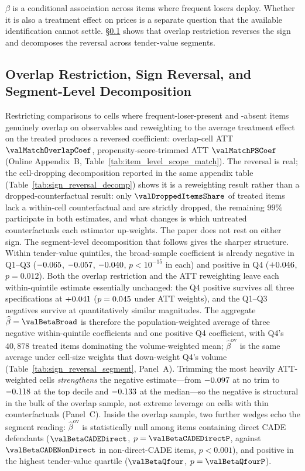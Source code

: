 $\beta$ is a conditional association across items where
frequent losers deploy. Whether it is also a treatment effect
on prices is a separate question that the available
identification cannot settle. \S\ref{sec:results_overlap}
shows that overlap restriction reverses the sign and
decomposes the reversal across tender-value segments.

\subsection{Overlap Restriction, Sign Reversal, and Segment-Level Decomposition}
\label{sec:results_overlap}

Restricting comparisons to cells where frequent-loser-present
and -absent items genuinely overlap on observables and
reweighting to the average treatment effect on the treated
produces a reversed coefficient: overlap-cell ATT
$\valMatchOverlapCoef$, propensity-score-trimmed ATT
$\valMatchPSCoef$ (Online Appendix~B,
Table~\ref{tab:item_level_scope_match}). The reversal is real;
the cell-dropping decomposition reported in the same appendix
table (Table~\ref{tab:sign_reversal_decomp}) shows it is a
reweighting result rather than a dropped-counterfactual result:
only $\valDroppedItemsShare$ of treated items lack a within-cell
counterfactual and are strictly dropped, the remaining
$99\%$ participate in both estimates, and what changes is
which untreated counterfactuals each estimator up-weights.
The paper does not rest on either sign. The segment-level
decomposition that follows gives the sharper structure. Within
tender-value quintiles, the broad-sample coefficient is already
negative in Q1--Q3 ($-0.065$, $-0.057$,
$-0.040$, $p<10^{-15}$ in each) and positive in Q4
($+0.046$, $p=0.012$). Both the overlap restriction and
the ATT reweighting leave each within-quintile estimate
essentially unchanged: the Q4 positive survives all three
specifications at $+0.041$ ($p=0.045$ under ATT
weights), and the Q1--Q3 negatives survive at quantitatively
similar magnitudes. The aggregate $\widehat\beta=\valBetaBroad$
is therefore the population-weighted average of three negative
within-quintile coefficients and one positive Q4 coefficient,
with Q4's $40{,}878$ treated items dominating the volume-weighted
mean; $\widehat\beta^{\text{ov}}$ is the same average under
cell-size weights that down-weight Q4's volume
(Table~\ref{tab:sign_reversal_segment}, Panel~A). Trimming
the most heavily ATT-weighted cells \emph{strengthens} the
negative estimate---from $-0.097$ at no trim to
$-0.118$ at the top decile and $-0.133$ at the
median---so the negative is structural in the bulk of the overlap
sample, not extreme leverage on cells with thin counterfactuals
(Panel~C). Inside the overlap sample, two further wedges echo the
segment reading: $\widehat\beta^{\text{ov}}$ is statistically null
among items containing direct CADE defendants ($\valBetaCADEDirect$,
$p=\valBetaCADEDirectP$, against $\valBetaCADENonDirect$ in
non-direct-CADE items, $p<0.001$), and positive in the highest
tender-value quartile ($\valBetaQfour$, $p=\valBetaQfourP$).

